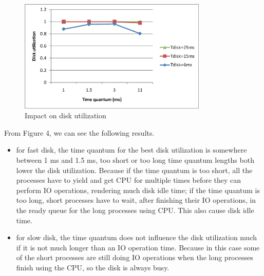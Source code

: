 \documentclass[12pt,letterpaper]{article}
\begin{document}
\begin{figure}[h]
\begin{center}
\includegraphics[width=0.8\textwidth]{diskUtil.eps}
\caption{Impact on disk utilization}
\end{center}
\end{figure}

From Figure 4, we can see the following results.

\begin{itemize}
\item for fast disk, the time quantum for the best disk utilization is somewhere between 1 ms and 1.5 ms, too short or too long time quantum lengths both lower the disk utilization. Because if the time quantum is too short, all the processes have to yield and get CPU for multiple times before they can perform IO operations, rendering much disk idle time; if the time quantum is too long, short processes have to wait, after finishing their IO operations, in the ready queue for the long processes using CPU. This also cause disk idle time.
\item for slow disk, the time quantum does not influence the disk utilization much if it is not much longer than an IO operation time. Because in this case some of the short processes are still doing IO operations when the long processes finish using the CPU, so the disk is always busy.
\end{itemize}
\end{document}
